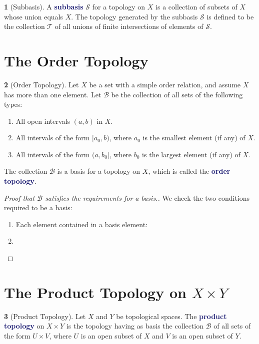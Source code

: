 \documentclass[12pt]{article}
\newcommand{\navy}[1]{\textcolor{MidnightBlue}{\bf #1}}
\theoremstyle{plain}
\theoremstyle{definition}
\newtheorem{definition}{\color{MidnightBlue}{\textbf{Definition}}}[section]
\newcommand{\1}{\mathbbm 1}
\newcommand{\sS}{\mathscr S}
\newcommand{\tT}{\mathcal T}
\newcommand{\bB}{\mathcal B}
\begin{document}
\begin{definition}[Subbasis]
	A \navy{subbasis} $\sS$ for a topology on $X$ is a collection of subsets of $X$ whose union equals $X$. The topology generated by the subbasis $\sS$ is defined to be the collection $\tT$ of all unions of finite intersections of elements of $\sS$.
\end{definition}

\section{The Order Topology}

\begin{definition}[Order Topology]
	Let $X$ be a set with a simple order relation, and assume $X$ has more than one element. Let $\bB$ be the collection of all sets of the following types:
	\begin{enumerate}
		\item All open intervals $(a,b)$ in $X$.
		\item All intervals of the form $[a_0, b)$, where $a_0$ is the smallest element (if any) of $X$.
		\item All intervals of the form $(a,b_0]$, where $b_0$ is the largest element (if any) of $X$. 
	\end{enumerate}
	The collection $\bB$ is a basis for a topology on $X$, which is called the \navy{order topology}.
\end{definition}

\begin{proof}[Proof that $\bB$ satisfies the requirements for a basis.] 
	We check the two conditions required to be a basis:
	\begin{enumerate}
		\item Each element contained in a basis element: 
		\item 
	\end{enumerate}
\end{proof}



\section[The Product Topology]{The Product Topology on $X \times Y$}

\begin{definition}[Product Topology]
	Let $X$ and $Y$ be topological spaces. The \navy{product topology} on $X \times Y$ is the topology having as basis the collection $\bB$ of all sets of the form $U \times V$, where $U$ is an open subset of $X$ and $V$ is an open subset of $Y$.
\end{definition}
\end{document}
